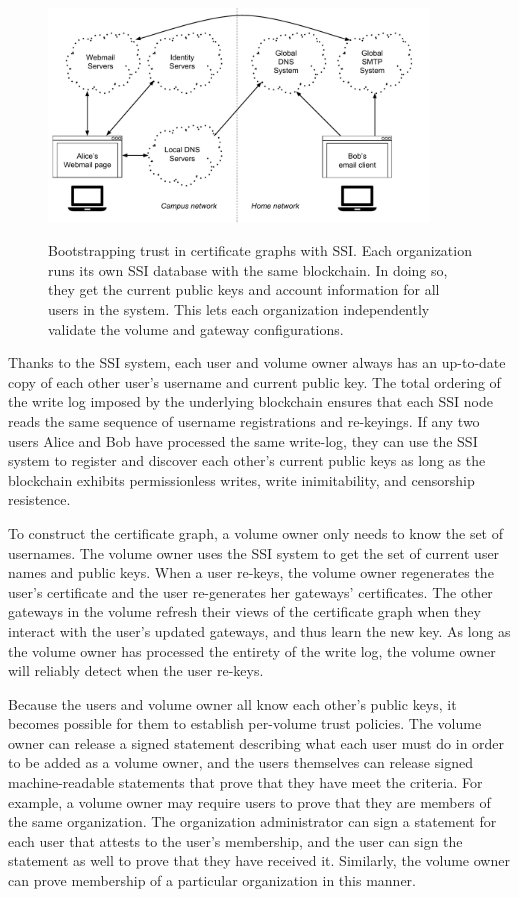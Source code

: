 \begin{figure}[h!]
   \caption{Bootstrapping trust in certificate graphs with SSI.  Each
   organization runs its own SSI database with the same blockchain.  In doing
   so, they get the current public keys and account information for all users in
   the system.  This lets each organization independently validate the volume
   and gateway configurations.}
   \centering
   \includegraphics[width=0.9\textwidth,page=15]{figures/dissertation-figures}
   \label{fig:chap2-ssi-system-with-volumes}
\end{figure}

Thanks to the SSI system, each user and volume owner always has an up-to-date
copy of each other user's username and current public key.  The total ordering
of the write log imposed by the underlying blockchain
ensures that each SSI node reads the same sequence of
username registrations and re-keyings.  If any two users Alice and Bob have
processed the same write-log, they can use the SSI system to register and
discover each other's current public keys as long as the blockchain exhibits
permissionless writes, write inimitability, and censorship resistence. 

To construct the certificate graph, a volume owner only needs to know the set of
usernames.  The volume owner uses the SSI system to get the set of current
user names and public keys.  When a user re-keys, the volume owner regenerates the user's
certificate and the user re-generates her gateways' certificates.  The other
gateways in the volume refresh their views of the certificate graph when they
interact with the user's updated gateways, and thus learn the new key.
As long as the volume owner has
processed the entirety of the write log, the volume owner will reliably detect
when the user re-keys.

Because the users and volume owner all know each other's public keys, it becomes
possible for them to establish per-volume trust policies.  The volume owner
can release a signed statement describing what each user must do in order to be
added as a volume owner, and the users themselves can release signed
machine-readable statements that prove that they have meet the criteria.  For example, a volume owner may
require users to prove that they are members of the same organization.  The
organization administrator can sign a statement for each user that attests to the user's
membership, and the user can sign the statement as well to prove that they have
received it.  Similarly, the volume owner can prove membership of a particular
organization in this manner.


